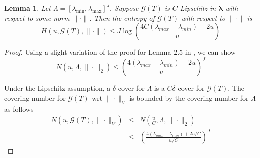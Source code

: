 \documentclass[12pt]{article}
\newtheorem{lemma}{Lemma}
\begin{document}
\begin{lemma}
	\label{lemma:covering_cube}
	Let $\Lambda = [\lambda_{\min}, \lambda_{\max}]^J$. Suppose $\mathcal{G}(T)$ is $C$-Lipschitz in $\boldsymbol{\lambda}$ with respect to some norm $\| \cdot \|$.
	Then the entropy of $\mathcal{G}(T)$ with respect to $\| \cdot \|$ is
	\begin{equation}
	H\left(u, \mathcal{G}(T),\|\cdot\|\right) \le
	J \log \left(\frac{4C\left(\lambda_{max}-\lambda_{min}\right)+2u}{u}\right)
	\end{equation}
\end{lemma}
\begin{proof}
	Using a slight variation of the proof for Lemma 2.5 in \citet{van2000empirical}, we can show
	\begin{equation}
	N\left(u,\Lambda,\|\cdot\|_{2}\right) \le \left(\frac{4\left(\lambda_{max}-\lambda_{min}\right)+2u}{u}\right)^{J}
	\end{equation}
	
	Under the Lipschitz assumption, a $\delta$-cover for $\Lambda$
	is a $C\delta$-cover for $\mathcal{G}(T)$. The covering number for $\mathcal{G}(T)$ wrt $\|\cdot\|_{V}$ is bounded by the covering number for $\Lambda$ as follows
	\begin{eqnarray}
	N\left(u,\mathcal{G}(T),\|\cdot\|_{V}\right)
	&\le& N\left(\frac{u}{C},\Lambda,\|\cdot\|_{2}\right)\\
	&\le& \left(\frac{4\left(\lambda_{max}-\lambda_{min}\right)+2u/C}{u/C}\right)^{J}
	\end{eqnarray}
\end{proof}
\end{document}
